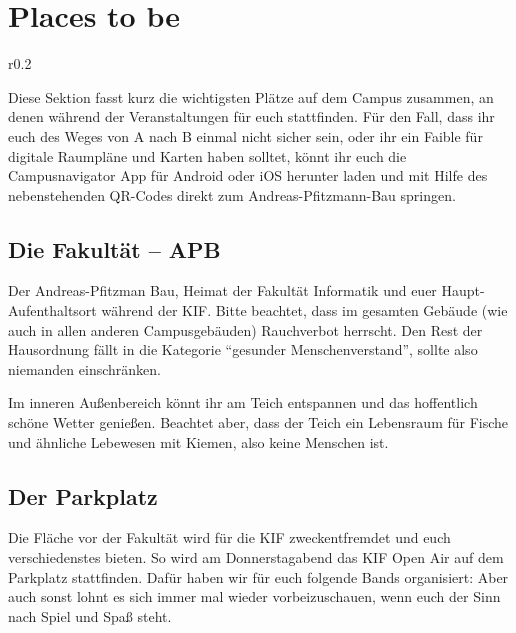 
\section*{Places to be}

\begin{wrapfigure}{r}{0.2\textwidth}
  \vspace*{-11pt}
  \textcolor{KIFgrey}{}
\end{wrapfigure}

Diese Sektion fasst kurz die wichtigsten Plätze auf dem Campus zusammen, an denen während der \KIF Veranstaltungen für euch stattfinden.
Für den Fall, dass ihr euch des Weges von A nach B einmal nicht sicher sein, oder ihr ein Faible für digitale Raumpläne und Karten haben solltet, könnt ihr euch die Campusnavigator App für Android  oder iOS  herunter laden und mit Hilfe des nebenstehenden QR-Codes direkt zum Andreas-Pfitzmann-Bau springen.

\subsection*{Die Fakultät -- APB}
Der Andreas-Pfitzman Bau, Heimat der Fakultät Informatik und euer Haupt-Aufenthaltsort während der KIF\@.
Bitte beachtet, dass im gesamten Gebäude (wie auch in allen anderen Campusgebäuden) Rauchverbot herrscht.
Den Rest der Hausordnung fällt in die Kategorie \enquote{gesunder Menschenverstand}, sollte also niemanden einschränken.

Im inneren Außenbereich könnt ihr am Teich entspannen und das hoffentlich schöne Wetter genießen.
Beachtet aber, dass der Teich ein Lebensraum für Fische und ähnliche Lebewesen mit Kiemen, also keine Menschen ist.

\subsection*{Der Parkplatz}
Die Fläche vor der  Fakultät wird für die KIF zweckentfremdet und euch verschiedenstes bieten.  So wird am Donnerstagabend das KIF Open Air auf dem Parkplatz stattfinden. Dafür haben wir für euch folgende Bands organisiert:
Aber auch sonst lohnt es sich immer mal wieder vorbeizuschauen, wenn euch der Sinn nach Spiel und Spaß steht.

